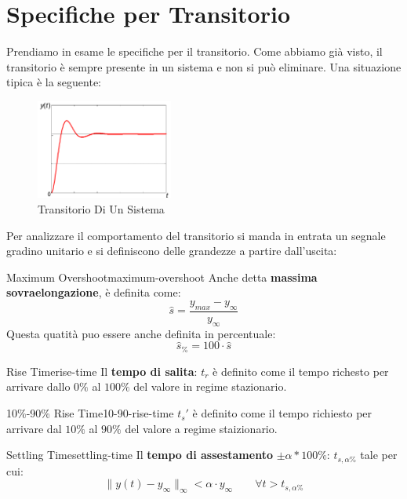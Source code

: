 \documentclass[12pt]{article}
\begin{document}
\section{Specifiche per Transitorio}
Prendiamo in esame le specifiche per il transitorio. Come abbiamo gi\`a visto, il transitorio \`e sempre presente in un sistema e non si pu\`o eliminare. Una situazione tipica \`e la seguente:
\begin{figure}[H]
    \centering
    \includegraphics[width=0.4\textwidth]{transitorio-di-un-sistema.png}
    \caption{Transitorio Di Un Sistema}
    \label{fig:transitorio-di-un-sistema}
\end{figure}
Per analizzare il comportamento del transitorio si manda in entrata un segnale gradino unitario e si definiscono delle grandezze a partire dall'uscita:
\begin{definition}{Maximum Overshoot}{maximum-overshoot}
    Anche detta \textbf{massima sovraelongazione}, \`e definita come:
    \[ \hat{s} = \frac{y _{max} - y _{\infty}}{ y _{\infty}}  \]
    Questa quatit\`a puo essere anche definita in percentuale:
    \[ \hat{s}_{\%} = 100\cdot \hat{s} \]
\end{definition}

\begin{definition}{Rise Time}{rise-time}
    Il \textbf{tempo di salita}: $t_r$ \`e definito come il tempo richesto per arrivare dallo $0\%$ al $100\%$ del valore in regime stazionario.
\end{definition}

\begin{definition}{10\%-90\% Rise Time}{10-90-rise-time}
    $t_s'$ \`e definito come il tempo richiesto per arrivare dal $10\%$ al $90\%$ del valore a regime staizionario.
\end{definition}

\begin{definition}{Settling Time}{settling-time}
    Il \textbf{tempo di assestamento} $ \pm \alpha * 100\%$: $t _{s,\alpha\%}$ tale per cui:
    \[  \| y(t) - y _{\infty} \|_{\infty}  < \alpha \cdot y _{\infty} \qquad \forall t > t _{s,\alpha\%} \]
\end{definition}
\end{document}
